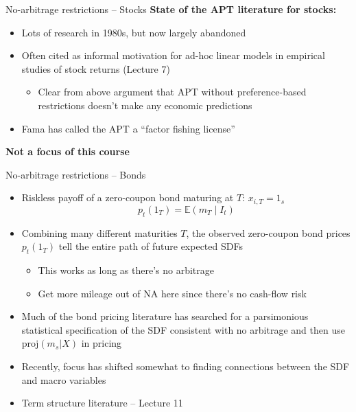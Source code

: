 \documentclass[xcolor=table, aspectratio=169]{beamer}
\begin{document}
\begin{frame}{No-arbitrage restrictions -- Stocks}
\textbf{State of the APT literature for stocks:}
\begin{itemize}
\item Lots of research in 1980s, but now largely abandoned
\item Often cited as informal motivation for ad-hoc linear models in empirical studies of stock returns (Lecture 7)
\begin{itemize}
\item Clear from above argument that APT without preference-based restrictions doesn't make any economic predictions
\end{itemize}
\item Fama has called the APT a ``factor fishing license''
\end{itemize}
\vskip 8pt
\textbf{Not a focus of this course}
\end{frame}

\begin{frame}{No-arbitrage restrictions -- Bonds}
\begin{itemize}
\item Riskless payoff of a zero-coupon bond maturing at $T$: $x_{i,T}=1_s$
$$p_t(1_T) = \mathbb{E} \left(m_T \middle\vert I_t \right)$$
\item Combining many different maturities $T$, the observed zero-coupon bond prices $p_t(1_T)$ tell the entire path of future expected SDFs
\begin{itemize}
\item This works as long as there's no arbitrage
\item Get more mileage out of NA here since there's no cash-flow risk
\end{itemize}
\item Much of the bond pricing literature has searched for a parsimonious statistical specification of the SDF consistent with no arbitrage and then use $\text{proj}\left( m_s \vert X \right)$ in pricing
\item Recently, focus has shifted somewhat to finding connections between the SDF and macro variables
\item Term structure literature -- Lecture 11
\end{itemize}
\end{frame}
\end{document}
